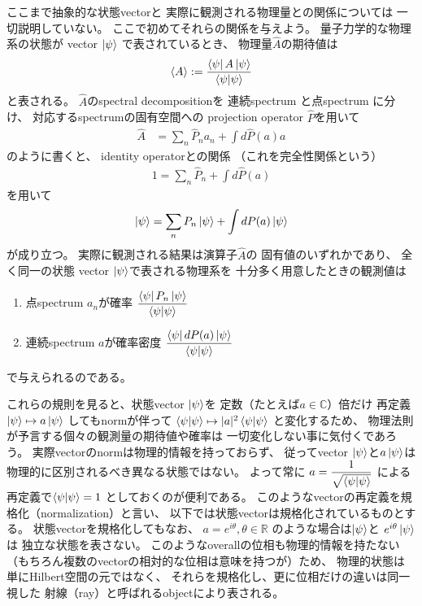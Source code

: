 ここまで抽象的な状態vectorと
実際に観測される物理量との関係については
一切説明していない。
ここで初めてそれらの関係を与えよう。
量子力学的な物理系の状態が
vector $\ket{\psi}$
で表されているとき、
物理量$\hat{A}$の期待値は
\begin{align}
    \braket{A} :=
    \dfrac{
        \bra{\psi} A \ket{\psi}
    }{
        \braket{\psi|\psi}
    }
\end{align}
と表される。
$\hat{A}$のspectral decompositionを
連続spectrum と点spectrum に分け、
対応するspectrumの固有空間への
projection operator $\hat{P}$を用いて
\begin{align}
    \hat{A} &=
    \sum_n { \hat{P}_n a_n }
    +
    \int d \hat{P} (a) a
\end{align}
のように書くと、
identity operatorとの関係
（これを完全性関係という）
\begin{align}
    1 =
    \sum_n \hat{P}_n
    +
    \int d \hat{P} (a)
\label{spectral decomposition of identity}
\end{align}
を用いて
\begin{align}
    \ket{\psi} =
    \sum_n P_n \ket{\psi}
    +
    \int d P (a) \ket{\psi}
\end{align}
が成り立つ。
実際に観測される結果は演算子$\hat{A}$の
固有値のいずれかであり、
全く同一の状態 vector $\ket{\psi}$で表される物理系を
十分多く用意したときの観測値は
\begin{enumerate}
    \item{点spectrum $a_n$が確率
    $
    \dfrac{
        \bra{\psi} P_n \ket{\psi}
    }{
     \braket{\psi|\psi}
    }
    $}
    \item{連続spectrum $a$が確率密度
    $
    \dfrac{
        \bra{\psi} d P(a) \ket{\psi}
    }{
     \braket{\psi|\psi}
    }
    $}
\end{enumerate}
で与えられるのである。

これらの規則を見ると、状態vector $\ket{\psi}$を
定数（たとえば$a \in \mathbb{C}$）倍だけ
再定義
$\ket{\psi} \mapsto a \ket{\psi}$
してもnormが伴って
$\braket{\psi|\psi} \mapsto |a|^2 \braket{\psi|\psi}$
と変化するため、
物理法則が予言する個々の観測量の期待値や確率は
一切変化しない事に気付くであろう。
実際vectorのnormは物理的情報を持っておらず、
従ってvector $\ket{\psi}$と$a \ket{\psi}$は
物理的に区別されるべき異なる状態ではない。
よって常に
$a = \dfrac{1}{\sqrt{ \braket{\psi|\psi} }}$
による再定義で$\braket{\psi|\psi} = 1$
としておくのが便利である。
このようなvectorの再定義を規格化（normalization）と言い、
以下では状態vectorは規格化されているものとする。
状態vectorを規格化してもなお、
$a=e^{i\theta}, \theta\in \mathbb{R}$
のような場合は$\ket{\psi}$と
$e^{i\theta}\ket{\psi}$は
独立な状態を表さない。
このようなoverallの位相も物理的情報を持たない
（もちろん複数のvectorの相対的な位相は意味を持つが）ため、
物理的状態は単にHilbert空間の元ではなく、
それらを規格化し、更に位相だけの違いは同一視した
射線（ray）と呼ばれるobjectにより表される。

